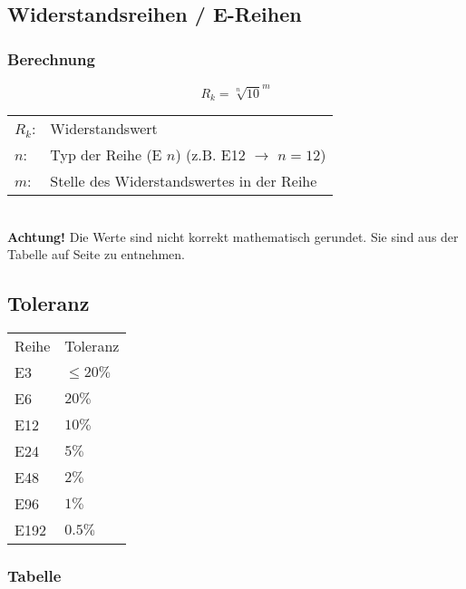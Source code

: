 



\subsection{Widerstandsreihen / E-Reihen}
\subsubsection{Berechnung}
\[ R_k = {\sqrt[n]{10}}^m \]
\begin{tabular}{@{}ll}
$R_k$: & Widerstandswert \\
$n$:   & Typ der Reihe (E $n$) (z.B. E12 $\rightarrow$ $n=12$) \\
$m$:   & Stelle des Widerstandswertes in der Reihe \\
\end{tabular} \\
\textbf{Achtung!} Die Werte sind nicht korrekt mathematisch gerundet. Sie sind 
aus der Tabelle auf Seite \pageref{subsubsec:ereihe_tab} zu entnehmen. 

\subsection{Toleranz}
\begin{tabular}{ll}
Reihe & Toleranz \\
E3   & $\leq20\%$ \\
E6   & $20\%$ \\
E12  & $10\%$ \\
E24  & $5\%$ \\
E48  & $2\%$ \\
E96  & $1\%$ \\
E192 & $0.5\%$ \\
\end{tabular}

\subsubsection{Tabelle}
\label{subsubsec:ereihe_tab}
